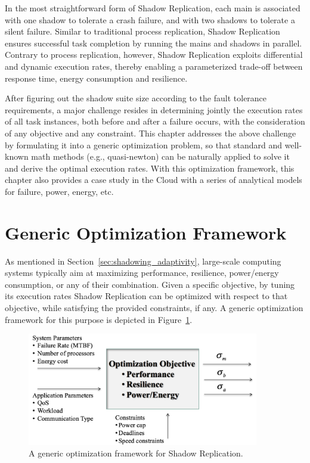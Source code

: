 In the most straightforward form of Shadow Replication, each main is associated with one shadow to tolerate a crash failure, and with two shadows to tolerate a silent failure. 
Similar to traditional process replication, Shadow Replication ensures successful task
completion by running the mains and shadows in parallel. Contrary to process replication, however, Shadow Replication
exploits differential and dynamic execution rates, thereby enabling a
parameterized trade-off between response time, energy consumption and resilience.

After figuring out the shadow suite size according to the fault tolerance requirements, a major challenge resides in determining
jointly the execution rates of all task instances, both before and
after a failure occurs, with the consideration of any objective and any constraint. This chapter addresses the above challenge by formulating it into a generic optimization problem, so that standard and well-known math methods (e.g., quasi-newton) can be naturally applied to solve it and derive the optimal execution rates. With this optimization framework, this chapter also provides a case study in the Cloud with a series of analytical models for failure, power, energy, etc. 

\section{Generic Optimization Framework}
As mentioned in Section~\ref{sec:shadowing_adaptivity}, large-scale computing systems typically aim at maximizing performance, resilience, power/energy consumption, or any of their combination. Given a specific objective, by tuning its execution rates Shadow Replication can be optimized with respect to that objective, while satisfying the provided constraints, if any. A generic optimization framework for this purpose is depicted in Figure~\ref{fig:opt_problem}.

\begin{figure}[t]
	\begin{center}
		\includegraphics[width=0.9\textwidth]{Figures/opt_problem}
	\end{center}
	\caption{A generic optimization framework for Shadow Replication.}
	\label{fig:opt_problem}
    \vskip -0.1in
\end{figure}

